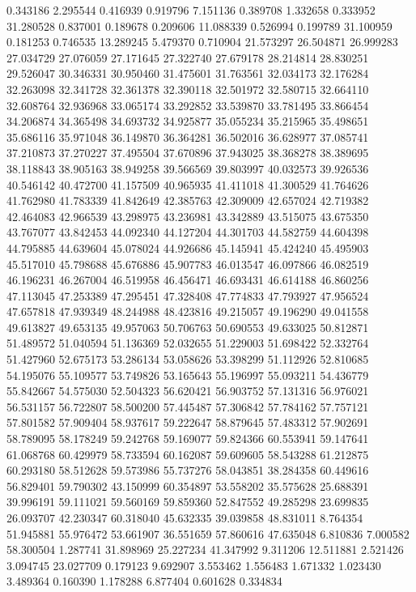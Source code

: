 0.343186
2.295544
0.416939
0.919796
7.151136
0.389708
1.332658
0.333952
31.280528
0.837001
0.189678
0.209606
11.088339
0.526994
0.199789
31.100959
0.181253
0.746535
13.289245
5.479370
0.710904
21.573297
26.504871
26.999283
27.034729
27.076059
27.171645
27.322740
27.679178
28.214814
28.830251
29.526047
30.346331
30.950460
31.475601
31.763561
32.034173
32.176284
32.263098
32.341728
32.361378
32.390118
32.501972
32.580715
32.664110
32.608764
32.936968
33.065174
33.292852
33.539870
33.781495
33.866454
34.206874
34.365498
34.693732
34.925877
35.055234
35.215965
35.498651
35.686116
35.971048
36.149870
36.364281
36.502016
36.628977
37.085741
37.210873
37.270227
37.495504
37.670896
37.943025
38.368278
38.389695
38.118843
38.905163
38.949258
39.566569
39.803997
40.032573
39.926536
40.546142
40.472700
41.157509
40.965935
41.411018
41.300529
41.764626
41.762980
41.783339
41.842649
42.385763
42.309009
42.657024
42.719382
42.464083
42.966539
43.298975
43.236981
43.342889
43.515075
43.675350
43.767077
43.842453
44.092340
44.127204
44.301703
44.582759
44.604398
44.795885
44.639604
45.078024
44.926686
45.145941
45.424240
45.495903
45.517010
45.798688
45.676886
45.907783
46.013547
46.097866
46.082519
46.196231
46.267004
46.519958
46.456471
46.693431
46.614188
46.860256
47.113045
47.253389
47.295451
47.328408
47.774833
47.793927
47.956524
47.657818
47.939349
48.244988
48.423816
49.215057
49.196290
49.041558
49.613827
49.653135
49.957063
50.706763
50.690553
49.633025
50.812871
51.489572
51.040594
51.136369
52.032655
51.229003
51.698422
52.332764
51.427960
52.675173
53.286134
53.058626
53.398299
51.112926
52.810685
54.195076
55.109577
53.749826
53.165643
55.196997
55.093211
54.436779
55.842667
54.575030
52.504323
56.620421
56.903752
57.131316
56.976021
56.531157
56.722807
58.500200
57.445487
57.306842
57.784162
57.757121
57.801582
57.909404
58.937617
59.222647
58.879645
57.483312
57.902691
58.789095
58.178249
59.242768
59.169077
59.824366
60.553941
59.147641
61.068768
60.429979
58.733594
60.162087
59.609605
58.543288
61.212875
60.293180
58.512628
59.573986
55.737276
58.043851
38.284358
60.449616
56.829401
59.790302
43.150999
60.354897
53.558202
35.575628
25.688391
39.996191
59.111021
59.560169
59.859360
52.847552
49.285298
23.699835
26.093707
42.230347
60.318040
45.632335
39.039858
48.831011
8.764354
51.945881
55.976472
53.661907
36.551659
57.860616
47.635048
6.810836
7.000582
58.300504
1.287741
31.898969
25.227234
41.347992
9.311206
12.511881
2.521426
3.094745
23.027709
0.179123
9.692907
3.553462
1.556483
1.671332
1.023430
3.489364
0.160390
1.178288
6.877404
0.601628
0.334834
